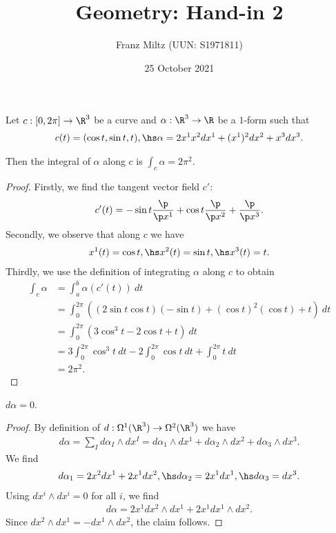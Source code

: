 \documentclass{article}
\begin{document}
\title{Geometry: Hand-in 2}
\author{Franz Miltz (UUN: S1971811)}
\date{25 October 2021}
\maketitle
\noindent Let $c:[0,2\pi] \to \R^3$ be a curve and $\alpha:\R^3\to\R$ be a $1$-form
such that
\begin{align*}
	c(t)   = (\cos t, \sin t, t), \hs
	\alpha = 2x^1x^2dx^1 + (x^1)^2dx^2 + x^3dx^3.
\end{align*}

\begin{claim*}
	Then the integral of $\alpha$ along $c$ is $\int_c \alpha = 2\pi^2$.
\end{claim*}
\begin{proof}
	Firstly, we find the tangent vector field $c'$:
	\begin{align*}
		c'(t) = -\sin t\frac{\p }{\p x^1} + \cos t\frac{\p }{\p x^2} + \frac{\p }{\p x^3} .
	\end{align*}
	Secondly, we observe that along $c$ we have
	\begin{align*}
		x^1(t) = \cos t, \hs x^2(t)= \sin t, \hs x^3(t) = t.
	\end{align*}
	Thirdly, we use the definition of integrating $\alpha$ along $c$ to obtain
	\begin{align*}
		\int_c \alpha & = \int_a^b \alpha(c'(t))\:dt                                                        \\
		              & = \int_0^{2\pi}\left( (2\sin t\cos t)(-\sin t) + (\cos t)^2 (\cos t) + t\right)\:dt \\
		              & = \int_0^{2\pi} \left(3\cos^3 t - 2 \cos t + t\right)\:dt                           \\
		              & = 3\int_0^{2\pi} \cos^3 t\:dt - 2 \int_0^{2\pi} \cos t\: dt + \int_0^{2\pi} t\:dt   \\
		              & = 2\pi^2.
	\end{align*}
\end{proof}

\begin{claim*}
	$d\alpha = 0$.
\end{claim*}
\begin{proof}
	By definition of $d:\Omega^1(\R^3) \to\Omega^2(\R^3)$ we have
	\begin{align*}
		d\alpha =\sum_I d\alpha_I\wedge dx^I
		= d\alpha_1\wedge dx^1 + d\alpha_2\wedge dx^2 + d\alpha_3\wedge dx^3.
	\end{align*}
	We find
	\begin{align*}
		d\alpha_1 = 2x^2dx^1 + 2x^1dx^2, \hs
		d\alpha_2 = 2x^1dx^1, \hs
		d\alpha_3 = dx^3.
	\end{align*}
	Using $dx^i\wedge dx^i=0$ for all $i$, we find
	\begin{align*}
		d\alpha = 2x^1dx^2\wedge dx^1 + 2x^1dx^1\wedge dx^2.
	\end{align*}
	Since $dx^2\wedge dx^1=-dx^1\wedge dx^2$, the claim follows.
\end{proof}
\end{document}
